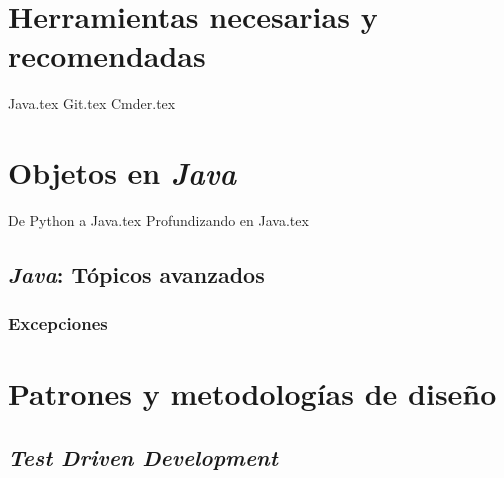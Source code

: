 \documentclass[12pt]{book}
\begin{document}
  \frontmatter
  \maketitle
  \tableofcontents
  

  \mainmatter
  \part{Herramientas necesarias y recomendadas}
    {Java.tex}
    {Git.tex}
    {Cmder.tex}
  \part{Objetos en \textit{Java}}
    
    {De Python a Java.tex}
    {Profundizando en Java.tex}
    \chapter{\textit{Java}: Tópicos avanzados}
      \label{ch:java-2}
      \section{Excepciones}
        \label{sec:exceptions}
  \part{Patrones y metodologías de diseño}
    \chapter{\textit{Test Driven Development}}
      \label{ch:tdd}
  \nocite{*}
  \printbibliography
\end{document}
